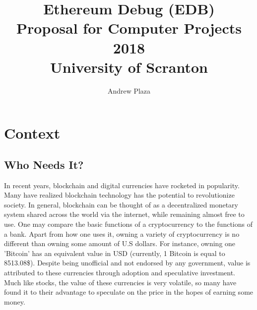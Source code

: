 \documentclass[]{article}
\title{%
	Ethereum Debug (EDB) \\
	\large	Proposal for Computer Projects 2018 \\
	\large University of Scranton}
\author{Andrew Plaza}
\begin{document}
\maketitle
\newpage
\tableofcontents
\newpage

\section{Context}
\subsection{Who Needs It?}

In recent years, blockchain and digital currencies have rocketed in popularity. Many have realized blockchain technology has the potential to revolutionize society. In general, blockchain can be thought of as a decentralized monetary system shared across the world via the internet, while remaining almost free to use. One may compare the basic functions of a cryptocurrency to the functions of a bank. Apart from how one uses it, owning a variety of cryptocurrency is no different than owning some amount of U.S dollars. For instance, owning one 'Bitcoin' has an equivalent value in USD (currently, 1 Bitcoin is equal to 8513.08\$). Despite being unofficial and not endorsed by any government, value is attributed to these currencies through adoption and speculative investment. Much like stocks, the value of these currencies is very volatile, so many have found it to their advantage to speculate on the price in the hopes of earning some money.
\end{document}
